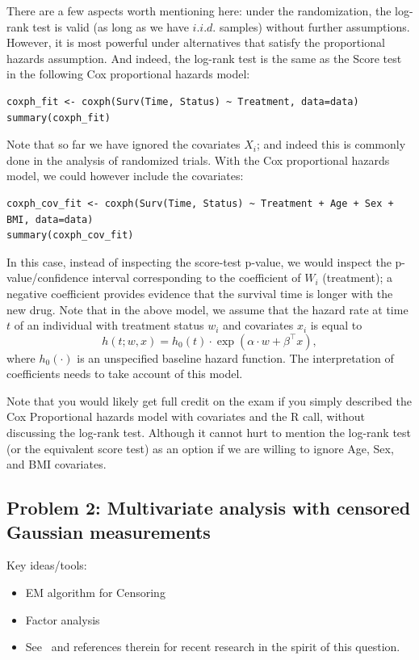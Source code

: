 There are a few aspects worth mentioning here: under the randomization, the log-rank test is valid (as long as we have $i.i.d.$ samples) without further assumptions. However, it is most powerful under alternatives that satisfy the proportional hazards assumption. And indeed, the log-rank test is the same as the Score test in the following Cox proportional hazards model:
\begin{verbatim}
coxph_fit <- coxph(Surv(Time, Status) ~ Treatment, data=data)
summary(coxph_fit)
\end{verbatim} 
Note that so far we have ignored the covariates $X_i$; and indeed this is commonly done in the analysis of randomized trials. With the Cox proportional hazards model, we could however include the covariates:

\begin{verbatim}
coxph_cov_fit <- coxph(Surv(Time, Status) ~ Treatment + Age + Sex + BMI, data=data)
summary(coxph_cov_fit)
\end{verbatim} 
In this case, instead of inspecting the score-test p-value, we would inspect the p-value/confidence interval corresponding to the coefficient of $W_i$ (treatment); a negative coefficient provides evidence that the survival time is longer with the new drug. Note that in the above model, we assume that the hazard rate at time $t$ of an individual with treatment status $w_i$ and covariates $x_i$ is equal to
$$ h(t; w,x) = h_0(t)\cdot \exp( \alpha \cdot w + \beta^\top x), $$
where $h_0(\cdot)$ is an unspecified baseline hazard function. The interpretation of coefficients needs to take account of this model.

Note that you would likely get full credit on the exam if you simply described the Cox Proportional hazards model with covariates and the R call, without discussing the log-rank test. Although it cannot hurt to mention the log-rank test (or the equivalent score test) as an option if we are willing to ignore Age, Sex, and BMI covariates.

\subsection*{Problem 2: Multivariate analysis with censored Gaussian measurements}


Key ideas/tools:
\begin{itemize}
  \item EM algorithm for Censoring
  \item Factor analysis
  \item See~\citet*{augugliaro2020} and references therein for recent research in the spirit of this question.
\end{itemize}

